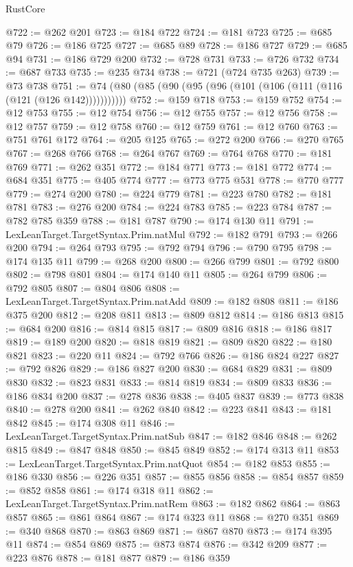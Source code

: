 \begin{lexlean}{RustCore}
\begin{coremodule}
@722 := @262 @201
@723 := @184 @722
@724 := @181 @723
@725 := @685 @79
@726 := @186 @725
@727 := @685 @89
@728 := @186 @727
@729 := @685 @94
@731 := @186 @729 @200
@732 := @728 @731
@733 := @726 @732
@734 := @687 @733
@735 := @235 @734
@738 := @721 (@724 @735 @263)
@739 := @73 @738
@751 := @74 (@80 (@85 (@90 (@95 (@96 (@101 (@106 (@111 (@116 (@121 (@126 @142)))))))))))
@752 := @159 @718
@753 := @159 @752
@754 := @12 @753
@755 := @12 @754
@756 := @12 @755
@757 := @12 @756
@758 := @12 @757
@759 := @12 @758
@760 := @12 @759
@761 := @12 @760
@763 := @751 @761 @172
@764 := @205 @125
@765 := @272 @200
@766 := @270 @765
@767 := @268 @766
@768 := @264 @767
@769 := @764 @768
@770 := @181 @769
@771 := @262 @351
@772 := @184 @771
@773 := @181 @772
@774 := @684 @351
@775 := @405 @774
@777 := @773 @775 @531
@778 := @770 @777
@779 := @274 @200
@780 := @224 @779
@781 := @223 @780
@782 := @181 @781
@783 := @276 @200
@784 := @224 @783
@785 := @223 @784
@787 := @782 @785 @359
@788 := @181 @787
@790 := @174 @130 @11
@791 := LexLeanTarget.TargetSyntax.Prim.natMul
@792 := @182 @791
@793 := @266 @200
@794 := @264 @793
@795 := @792 @794
@796 := @790 @795
@798 := @174 @135 @11
@799 := @268 @200
@800 := @266 @799
@801 := @792 @800
@802 := @798 @801
@804 := @174 @140 @11
@805 := @264 @799
@806 := @792 @805
@807 := @804 @806
@808 := LexLeanTarget.TargetSyntax.Prim.natAdd
@809 := @182 @808
@811 := @186 @375 @200
@812 := @208 @811
@813 := @809 @812
@814 := @186 @813
@815 := @684 @200
@816 := @814 @815
@817 := @809 @816
@818 := @186 @817
@819 := @189 @200
@820 := @818 @819
@821 := @809 @820
@822 := @180 @821
@823 := @220 @11
@824 := @792 @766
@826 := @186 @824 @227
@827 := @792 @826
@829 := @186 @827 @200
@830 := @684 @829
@831 := @809 @830
@832 := @823 @831
@833 := @814 @819
@834 := @809 @833
@836 := @186 @834 @200
@837 := @278 @836
@838 := @405 @837
@839 := @773 @838
@840 := @278 @200
@841 := @262 @840
@842 := @223 @841
@843 := @181 @842
@845 := @174 @308 @11
@846 := LexLeanTarget.TargetSyntax.Prim.natSub
@847 := @182 @846
@848 := @262 @815
@849 := @847 @848
@850 := @845 @849
@852 := @174 @313 @11
@853 := LexLeanTarget.TargetSyntax.Prim.natQuot
@854 := @182 @853
@855 := @186 @330
@856 := @226 @351
@857 := @855 @856
@858 := @854 @857
@859 := @852 @858
@861 := @174 @318 @11
@862 := LexLeanTarget.TargetSyntax.Prim.natRem
@863 := @182 @862
@864 := @863 @857
@865 := @861 @864
@867 := @174 @323 @11
@868 := @270 @351
@869 := @340 @868
@870 := @863 @869
@871 := @867 @870
@873 := @174 @395 @11
@874 := @854 @869
@875 := @873 @874
@876 := @342 @209
@877 := @223 @876
@878 := @181 @877
@879 := @186 @359

\end{coremodule}
\end{lexlean}
